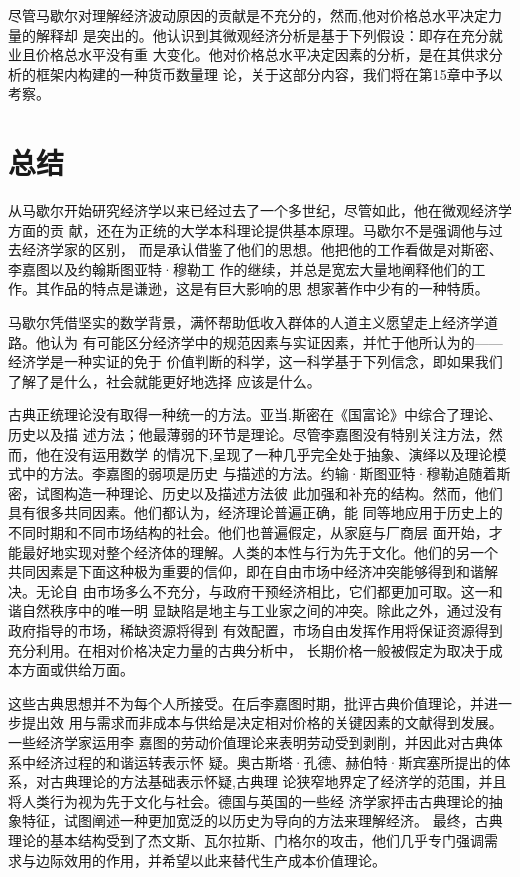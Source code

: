 尽管马歇尔对理解经济波动原因的贡献是不充分的，然而,他对价格总水平决定力量的解释却
是突出的。他认识到其微观经济分析是基于下列假设：即存在充分就业且价格总水平没有重
大变化。他对价格总水平决定因素的分析，是在其供求分析的框架内构建的一种货币数量理
论，关于这部分内容，我们将在第15章中予以考察。

\section{总结}

从马歇尔开始研究经济学以来已经过去了一个多世纪，尽管如此，他在微观经济学方面的贡
献，还在为正统的大学本科理论提供基本原理。马歇尔不是强调他与过去经济学家的区别，
而是承认借鉴了他们的思想。他把他的工作看做是对斯密、李嘉图以及约翰斯图亚特·穆勒工
作的继续，并总是宽宏大量地阐释他们的工作。其作品的特点是谦逊，这是有巨大影响的思
想家著作中少有的一种特质。

马歇尔凭借坚实的数学背景，满怀帮助低收入群体的人道主义愿望走上经济学道路。他认为
有可能区分经济学中的规范因素与实证因素，并忙于他所认为的——经济学是一种实证的免于
价值判断的科学，这一科学基于下列信念，即如果我们了解了是什么，社会就能更好地选择
应该是什么。

古典正统理论没有取得一种统一的方法。亚当.斯密在《国富论》中综合了理论、历史以及描
述方法；他最薄弱的环节是理论。尽管李嘉图没有特别关注方法，然而，他在没有运用数学
的情况下,呈现了一种几乎完全处于抽象、演绎以及理论模式中的方法。李嘉图的弱项是历史
与描述的方法。约输·斯图亚特·穆勒追随着斯密，试图构造一种理论、历史以及描述方法彼
此加强和补充的结构。然而，他们具有很多共同因素。他们都认为，经济理论普遍正确，能
同等地应用于历史上的不同时期和不同市场结构的社会。他们也普遍假定，从家庭与厂商层
面开始，才能最好地实现对整个经济体的理解。人类的本性与行为先于文化。他们的另一个
共同因素是下面这种极为重要的信仰，即在自由市场中经济冲突能够得到和谐解决。无论自
由市场多么不充分，与政府干预经济相比，它们都更加可取。这一和谐自然秩序中的唯一明
显缺陷是地主与工业家之间的冲突。除此之外，通过没有政府指导的市场，稀缺资源将得到
有效配置，市场自由发挥作用将保证资源得到充分利用。在相对价格决定力量的古典分析中，
长期价格一般被假定为取决于成本方面或供给万面。

这些古典思想并不为每个人所接受。在后李嘉图时期，批评古典价值理论，并进一步提出效
用与需求而非成本与供给是决定相对价格的关键因素的文献得到发展。一些经济学家运用李
嘉图的劳动价值理论来表明劳动受到剥削，并因此对古典体系中经济过程的和谐运转表示怀
疑。奥古斯塔·孔德、赫伯特·斯宾塞所提出的体系，对古典理论的方法基础表示怀疑,古典理
论狭窄地界定了经济学的范围，并且将人类行为视为先于文化与社会。德国与英国的一些经
济学家抨击古典理论的抽象特征，试图阐述一种更加宽泛的以历史为导向的方法来理解经济。
最终，古典理论的基本结构受到了杰文斯、瓦尔拉斯、门格尔的攻击，他们几乎专门强调需
求与边际效用的作用，并希望以此来替代生产成本价值理论。

